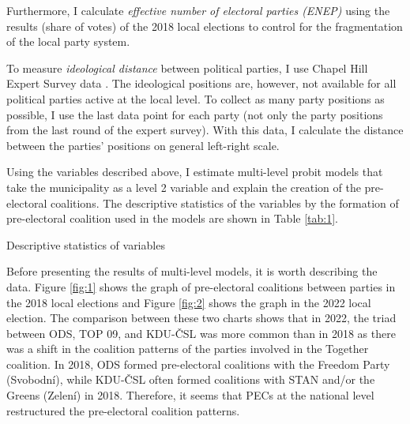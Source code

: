 \documentclass[]{interact}
\theoremstyle{plain}%
\theoremstyle{definition}
\theoremstyle{remark}
\begin{document}
Furthermore, I calculate \emph{effective number of electoral parties (ENEP)} using the results (share of votes) of the 2018 local elections to control for the fragmentation of the local party system. 

To measure \emph{ideological distance} between political parties, I use Chapel Hill Expert Survey data \citep{jolly2022}. The ideological positions are, however, not available for all political parties active at the local level. To collect as many party positions as possible, I use the last data point for each party (not only the party positions from the last round of the expert survey). With this data, I calculate the distance between the parties' positions on general left-right scale. 


Using the variables described above, I estimate multi-level probit models that take the municipality as a level 2 variable and explain the creation of the pre-electoral coalitions. The descriptive statistics of the variables by the formation of pre-electoral coalition used in the models are shown in Table \ref{tab:1}.

\begin{table}
\let\center\empty
\let\endcenter\relax
\centering
\caption{Descriptive statistics of variables \label{tab:1}}
{}
\end{table}

Before presenting the results of multi-level models, it is worth describing the data. Figure \ref{fig:1} shows the graph of pre-electoral coalitions between parties in the 2018 local elections and Figure \ref{fig:2} shows the graph in the 2022 local election. The comparison between these two charts shows that in 2022, the triad between ODS, TOP 09, and KDU-ČSL was more common than in 2018 as there was a shift in the coalition patterns of the parties involved in the Together coalition. In 2018, ODS formed pre-electoral coalitions with the Freedom Party (Svobodní), while KDU-ČSL often formed coalitions with STAN and/or the Greens (Zelení) in 2018. Therefore, it seems that PECs at the national level restructured the pre-electoral coalition patterns.  
\end{document}
